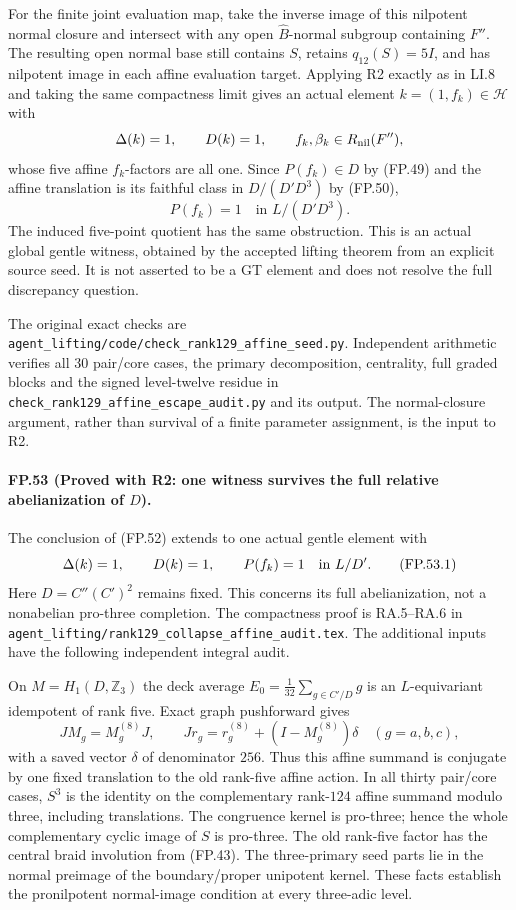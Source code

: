 For the finite joint evaluation map, take the inverse image
of this nilpotent normal closure and intersect with any
open $\widehat B$-normal subgroup containing $F''$.
The resulting open normal base still contains $S$, retains
$q_{12}(S)=5I$, and has nilpotent image in each affine
evaluation target. Applying R2 exactly as in LI.8 and taking
the same compactness limit gives an actual element
$k=(1,f_k)\in\mathcal H$ with
\[
 \Delta(k)=1,\qquad D(k)=1,\qquad
 f_k,\beta_k\in R_{\rm nil}(F''),
\]
whose five affine $f_k$-factors are all one. Since
$P(f_k)\in D$ by (FP.49) and the affine translation is its
faithful class in $D/(D'D^3)$ by (FP.50),
\[
                       P(f_k)=1\quad\text{in }L/(D'D^3).
 \tag{FP.52.3}
\]
The induced five-point quotient has the same obstruction.
This is an actual global gentle witness, obtained by the
accepted lifting theorem from an explicit source seed. It
is not asserted to be a GT element and does not resolve
the full discrepancy question.

The original exact checks are
\texttt{agent\_lifting/code/check\_rank129\_affine\_seed.py}.
Independent arithmetic verifies all $30$ pair/core cases,
the primary decomposition, centrality, full graded blocks
and the signed level-twelve residue in
\texttt{check\_rank129\_affine\_escape\_audit.py} and its
output. The normal-closure argument, rather than survival
of a finite parameter assignment, is the input to R2.

\paragraph{FP.53 (Proved with R2: one witness survives the full relative abelianization of $D$).}
The conclusion of (FP.52) extends to one actual gentle element with
\[
 \Delta(k)=1,\qquad D(k)=1,\qquad P(f_k)=1\quad\hbox{in }L/D'.
 \tag{FP.53.1}
\]
Here $D=C''(C')^2$ remains fixed. This concerns its full abelianization,
not a nonabelian pro-three completion. The compactness proof is
RA.5--RA.6 in
\texttt{agent\_lifting/rank129\_collapse\_affine\_audit.tex}.
The additional inputs have the following independent integral audit.

On $M=H_1(D,\mathbb Z_3)$ the deck average
$E_0=\frac1{32}\sum_{g\in C'/D}g$ is an $L$-equivariant idempotent
of rank five. Exact graph pushforward gives
\[
 JM_g=M_g^{(8)}J,\qquad
 Jr_g=r_g^{(8)}+(I-M_g^{(8)})\delta\quad(g=a,b,c),
 \tag{FP.53.2}
\]
with a saved vector $\delta$ of denominator $256$. Thus this affine
summand is conjugate by one fixed translation to the old rank-five
affine action. In all thirty pair/core cases, $S^3$ is the identity
on the complementary rank-$124$ affine summand modulo three,
including translations. The congruence kernel is pro-three; hence
the whole complementary cyclic image of $S$ is pro-three.
The old rank-five factor has the central braid involution from
(FP.43). The three-primary seed parts lie in the normal preimage
of the boundary/proper unipotent kernel. These facts establish the
pronilpotent normal-image condition at every three-adic level.

